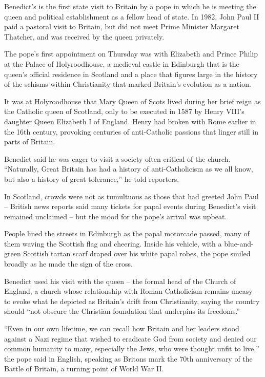 ﻿\documentclass[12pt]{article}
\begin{document}
Benedict's is the first state visit to Britain by a pope in which he is meeting the queen and
political establishment as a fellow head of state. In 1982, John Paul II paid a pastoral visit to
Britain, but did not meet Prime Minister Margaret Thatcher, and was received by the queen privately.

The pope's first appointment on Thursday was with Elizabeth and Prince Philip at the Palace of
Holyroodhouse, a medieval castle in Edinburgh that is the queen's official residence in Scotland and
a place that figures large in the history of the schisms within Christianity that marked Britain's
evolution as a nation.

It was at Holyroodhouse that Mary Queen of Scots lived during her brief reign as the Catholic queen
of Scotland, only to be executed in 1587 by Henry VIII's daughter Queen Elizabeth I of England.
Henry had broken with Rome earlier in the 16th century, provoking centuries of anti-Catholic
passions that linger still in parts of Britain.

Benedict said he was eager to visit a society often critical of the church. ``Naturally, Great
Britain has had a history of anti-Catholicism as we all know, but also a history of great
tolerance,'' he told reporters.

In Scotland, crowds were not as tumultuous as those that had greeted John Paul -- British news
reports said many tickets for papal events during Benedict's visit remained unclaimed -- but the
mood for the pope's arrival was upbeat.

People lined the streets in Edinburgh as the papal motorcade passed, many of them waving the
Scottish flag and cheering. Inside his vehicle, with a blue-and-green Scottish tartan scarf draped
over his white papal robes, the pope smiled broadly as he made the sign of the cross.

Benedict used his visit with the queen -- the formal head of the Church of England, a church whose
relationship with Roman Catholicism remains uneasy -- to evoke what he depicted as Britain's drift
from Christianity, saying the country should ``not obscure the Christian foundation that underpins
its freedoms.''

``Even in our own lifetime, we can recall how Britain and her leaders stood against a Nazi regime
that wished to eradicate God from society and denied our common humanity to many, especially the
Jews, who were thought unfit to live,'' the pope said in English, speaking as Britons mark the 70th
anniversary of the Battle of Britain, a turning point of World War II.
\end{document}
